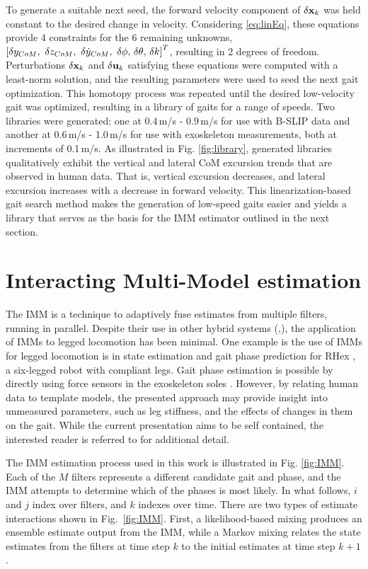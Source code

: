 To generate a suitable next seed, the forward velocity component of $ \delta \mathbf{x}_k$ was held constant to the desired change in velocity. Considering \eqref{eq:linEq}, these equations provide 4 constraints for the 6 remaining unknowns, $ \left[\delta y_\com,\ \delta z_\com,\ \delta\dot{y}_\com,\ \delta \phi,\, \delta \theta,\, \delta k\right]^T  $, resulting in 2 degrees of freedom. Perturbations $\delta \mathbf{x}_k$ and $\delta \mathbf{u}_k$ satisfying these equations were computed with a least-norm solution, and the resulting parameters were used to seed the next gait optimization. This homotopy process was repeated until the desired low-velocity gait was optimized, resulting in a library of gaits for a range of speeds. Two libraries were generated: one at 0.4\,m/s - 0.9\,m/s for use with B-SLIP data and another at 0.6\,m/s - 1.0\,m/s for use with exoskeleton measurements, both at increments of 0.1\,m/s. As illustrated in Fig. \ref{fig:library}, generated libraries qualitatively exhibit the vertical and lateral CoM excursion trends that are observed in human data. That is, vertical excursion decreases, and lateral excursion increases with a decrease in forward velocity. This linearization-based gait search method makes the generation of low-speed gaits easier and yields a library that serves as the basis for the IMM estimator outlined in the next section.

\section{Interacting Multi-Model estimation} \label{sec:IMM}

The IMM is a technique to  adaptively fuse estimates from multiple filters, running in parallel. Despite their use in other hybrid systems (\cite{bar2005imm},\cite{daeipour1998imm}), the application of IMMs to legged locomotion has been minimal. One example is the use of IMMs for legged locomotion is in state estimation and gait phase prediction for RHex \cite{skaff2005context}, a six-legged robot with compliant legs. Gait phase estimation is possible by directly using force
sensors in the exoskeleton soles \cite{agostini2013segmentation,de2012gait}. However, by relating human data to template models, the presented approach may provide insight into unmeasured parameters, such as leg stiffness, and the effects of changes in them on the gait. While the current presentation aims to be self contained, the interested reader is referred to \cite{Crassidis} for additional detail.

The IMM estimation process used in this work is illustrated in Fig. \ref{fig:IMM}. Each of the $M$ filters represents a different candidate gait and phase, and the IMM attempts to determine which of the phases is most likely. In what follows, $ i $ and $ j $ index over filters, and $ k$ indexes over time. There are two types of estimate interactions shown in Fig.~\ref{fig:IMM}. First, a likelihood-based mixing produces an ensemble estimate output from the IMM, while a Markov mixing relates the state estimates from the filters at time step $k$ to the initial estimates at time step $k+1$. 

